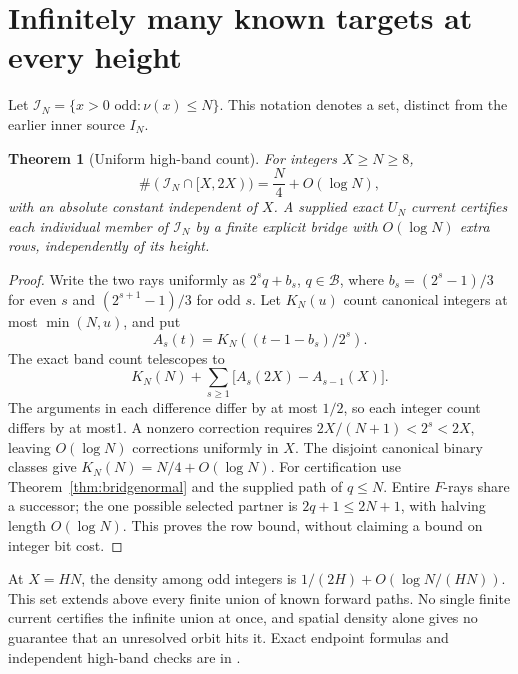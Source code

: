 \documentclass[11pt]{article}
\newtheorem{theorem}{Theorem}
\begin{document}
\section{Infinitely many known targets at every height}
Let $\mathcal I_N=\{x>0\text{ odd}:\nu(x)\le N\}$.
This notation denotes a set, distinct from the earlier inner source $I_N$.
\begin{theorem}[Uniform high-band count]\label{thm:knownfibres}
For integers $X\ge N\ge8$,
\[
\#(\mathcal I_N\cap[X,2X))=\frac N4+O(\log N),
\]
with an absolute constant independent of $X$. A supplied exact $U_N$
current certifies each individual member of $\mathcal I_N$ by a finite
explicit bridge with $O(\log N)$ extra rows, independently of its height.
\end{theorem}
\begin{proof}
Write the two rays uniformly as $2^sq+b_s$, $q\in\mathcal B$, where
$b_s=(2^s-1)/3$ for even $s$ and $(2^{s+1}-1)/3$ for odd $s$.
Let $K_N(u)$ count canonical integers at most $\min(N,u)$, and put
\[
A_s(t)=K_N((t-1-b_s)/2^s).
\]
The exact band count telescopes to
\[
K_N(N)+\sum_{s\ge1}\bigl[A_s(2X)-A_{s-1}(X)\bigr].
\]
The arguments in each difference differ by at most $1/2$, so each
integer count differs by at most1. A nonzero correction requires
$2X/(N+1)<2^s<2X$, leaving $O(\log N)$ corrections uniformly in $X$.
The disjoint canonical binary classes give $K_N(N)=N/4+O(\log N)$.
For certification use Theorem~\ref{thm:bridgenormal} and the supplied
path of $q\le N$. Entire $F$-rays share a successor; the one possible
selected partner is $2q+1\le2N+1$, with halving length $O(\log N)$.
This proves the row bound, without claiming a bound on integer bit cost.
\end{proof}
At $X=HN$, the density among odd integers is
$1/(2H)+O(\log N/(HN))$. This set extends above every finite union of
known forward paths. No single finite current certifies the infinite union
at once, and spatial density alone gives no guarantee that an unresolved
orbit hits it. Exact endpoint formulas and independent high-band checks
are in .
\end{document}
